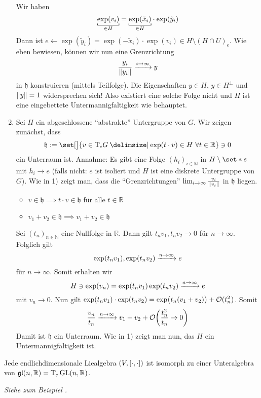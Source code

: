 \begin{beweis}
\begin{enumerate}[1)]
		Wir haben
		\[
			\Underbracket{\exp(v_i)}{\in H} = \Underbracket{\exp(\tilde{x}_i)}{\in H} \cdot \exp(\tilde{y}_i)
		\]
		Dann ist $e \longleftarrow  \exp(\tilde{y}_i) = \exp(- \tilde{x}_i) \cdot \exp(v_i) \in H \setminus (H \cap U)_e$.
		Wie eben bewiesen, können wir nun eine Grenzrichtung 
		\[
			\frac{y_i}{\norm*{y_i}} \grenzw{i \to \infty}  y
		\]
		in $\mathfrak{h}$ konstruieren (mittels Teilfolge).
		Die Eigenschaften $y \in H$, $y \in H^\bot$ und $\norm*{y}=1$ widersprechen sich!
		Also existiert eine solche Folge nicht und $H$ ist eine eingebettete Untermannigfaltigkeit wie behauptet.
		\item Sei $H$ ein abgeschlossene \enquote{abstrakte} Untergruppe von $G$.
		Wir zeigen zunächst, dass 
		\[
			\mathfrak{h} := \set[\big]{v \in \Tmap_e G \given \exp(t \cdot v) \in H \,\,\forall t \in \mathbb{R}} \ni 0
		\]
		ein Unterraum ist.
		Annahme: Es gibt eine Folge $(h_i)_{i \in \mathbb{N}}$ in $H \setminus \set*{e}$ mit $h_i \to e$ (falls nicht: $e$ ist isoliert und $H$ ist eine diskrete Untergruppe von $G$).
		Wie in 1) zeigt man, dass die \enquote{Grenzrichtungen} $\lim_{i \to \infty} \frac{v_i}{\norm*{v_i}}$ in $\mathfrak{h}$ liegen.
		\begin{itemize}[itemsep=0pt]
			\item $v \in \mathfrak{h} \implies t \cdot v \in \mathfrak{h}$ für alle $t \in \mathbb{R}$
			\item $v_1 + v_2 \in \mathfrak{h} \implies v_1 + v_2 \in \mathfrak{h}$
		\end{itemize}
		Sei $(t_n)_{n \in \mathbb{N}}$ eine Nullfolge in $\mathbb{R}$.
		Dann gilt $t_n v_1, t_n v_2 \to 0$ für $n \to \infty$.
		Folglich gilt 
		\[
			\exp(t_n v_1), \exp(t_n v_2) \grenzw{n \to \infty} e 
		\]
		für $n \to \infty$. Somit erhalten wir
		\[
			H \ni \exp(v_n) = \exp \enbrace*{t_n v_1} \exp(t_n v_2) \grenzw{n \to \infty} e
		\]
		mit $v_n \to 0$.
		Nun gilt $\exp(t_n v_1) \cdot \exp(t_n v_2) = \exp \enbrace[\big]{t_n(v_1 + v_2)} + \mathcal{O}(t_n^2)$.
		Somit
		\[
			\frac{v_n}{t_n} \grenzw{n \to \infty} v_1 +v_2 + \mathcal{O} \enbrace*{\frac{t_n^2}{t_n} \to 0 } 
		\]
		Damit ist $\mathfrak{h}$ ein Unterraum.
		Wie in 1) zeigt man nun, das $H$ ein Untermannigfaltigkeit ist.\qedhere
	\end{enumerate}
\end{beweis}

\begin{satz}[name={Ado},label=satz:1211]
	Jede endlichdimensionale Liealgebra $(V,\benbrace*{\cdot,\cdot})$ ist isomorph zu einer Unteralgebra von $\mathfrak{gl}(n,\mathbb{R}) = \Tmap_e \GL(n,\mathbb{R})$.
\end{satz}
\begin{beweis}
	\emph{Siehe zum Beispiel \cite[S. 199]{JacobsonLieAlg}.}
\end{beweis}

